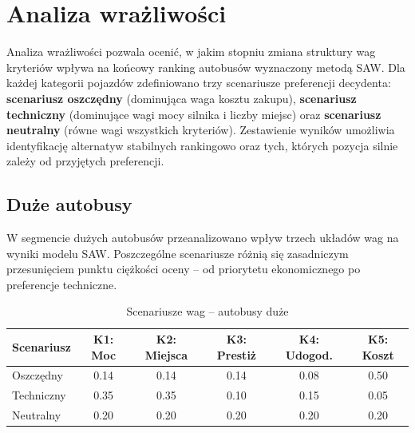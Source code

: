 \chapter{Analiza wrażliwości}

Analiza wrażliwości pozwala ocenić, w jakim stopniu zmiana struktury wag kryteriów wpływa na końcowy ranking autobusów wyznaczony metodą SAW. Dla każdej kategorii pojazdów zdefiniowano trzy scenariusze preferencji decydenta: \textbf{scenariusz oszczędny} (dominująca waga kosztu zakupu), \textbf{scenariusz techniczny} (dominujące wagi mocy silnika i liczby miejsc) oraz \textbf{scenariusz neutralny} (równe wagi wszystkich kryteriów). Zestawienie wyników umożliwia identyfikację alternatyw stabilnych rankingowo oraz tych, których pozycja silnie zależy od przyjętych preferencji.


\section{Duże autobusy}

W segmencie dużych autobusów przeanalizowano wpływ trzech układów wag na wyniki modelu SAW. Poszczególne scenariusze różnią się zasadniczym przesunięciem punktu ciężkości oceny -- od priorytetu ekonomicznego po preferencje techniczne.

\begin{table}[H]
    \centering
    \caption{Scenariusze wag -- autobusy duże}
    \vspace{0.2cm}
    \begin{tabular}{|l|c|c|c|c|c|}
        \hline
        \textbf{Scenariusz} & \textbf{K1: Moc} & \textbf{K2: Miejsca} & \textbf{K3: Prestiż} & \textbf{K4: Udogod.} & \textbf{K5: Koszt} \\ \hline
        Oszczędny  & 0.14 & 0.14 & 0.14 & 0.08 & 0.50 \\ \hline
        Techniczny & 0.35 & 0.35 & 0.10 & 0.15 & 0.05 \\ \hline
        Neutralny  & 0.20 & 0.20 & 0.20 & 0.20 & 0.20 \\ \hline
    \end{tabular}
\end{table}

